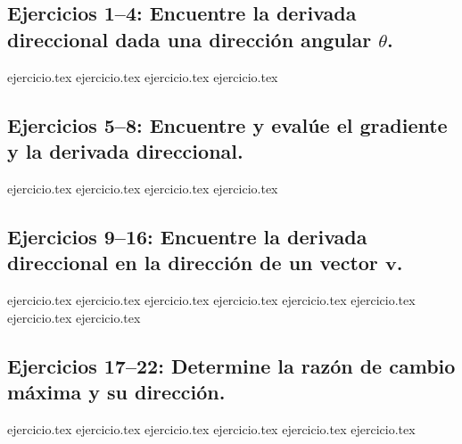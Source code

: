 
\subsection*{Ejercicios 1--4: Encuentre la derivada direccional dada una dirección angular $\theta$.}
\begin{enumerate}
    {ejercicio.tex}
    {ejercicio.tex}
    {ejercicio.tex}
    {ejercicio.tex}
\end{enumerate}

\subsection*{Ejercicios 5--8: Encuentre y evalúe el gradiente y la derivada direccional.}
\begin{enumerate}
    \setcounter{enumi}{4}
    {ejercicio.tex}
    {ejercicio.tex}
    {ejercicio.tex}
    {ejercicio.tex}
\end{enumerate}

\subsection*{Ejercicios 9--16: Encuentre la derivada direccional en la dirección de un vector $\mathbf{v}$.}
\begin{enumerate}
    \setcounter{enumi}{8}
    {ejercicio.tex}
    {ejercicio.tex}
    {ejercicio.tex}
    {ejercicio.tex}
    {ejercicio.tex}
    {ejercicio.tex}
    {ejercicio.tex}
    {ejercicio.tex}
\end{enumerate}

\subsection*{Ejercicios 17--22: Determine la razón de cambio máxima y su dirección.}
\begin{enumerate}
    \setcounter{enumi}{16}
    {ejercicio.tex}
    {ejercicio.tex}
    {ejercicio.tex}
    {ejercicio.tex}
    {ejercicio.tex}
    {ejercicio.tex}
\end{enumerate}


